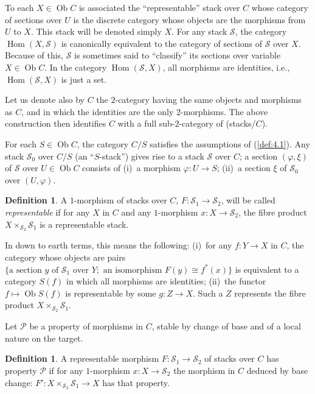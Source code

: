 \documentclass[10pt]{amsart}
\theoremstyle{plain}
\theoremstyle{definition}
\newtheorem{definition}[theorem]{Definition}
\DeclareMathOperator{\Hom}{Hom}
\DeclareMathOperator{\Ob}{Ob}
\begin{document}
To each $X \in \Ob C$ is associated the ``representable'' stack over $C$ whose category of sections over $U$ is the discrete category whose objects are the morphisms from $U$ to $X$. This stack will be denoted simply $X$. For any stack $\mathscr{S}$, the category $\Hom(X, \mathscr{S})$ is canonically equivalent to the category of sections of $\mathscr{S}$ over $X$. Because of this, $\mathscr{S}$ is sometimes said to ``classify'' its sections over variable $X \in \Ob C$. In the category $\Hom(\mathscr{S}, X)$, all morphisms are identities, i.e., $\Hom(\mathscr{S}, X)$ is just a set.

Let us denote also by $C$ the $2$-category having the same objects and morphisms as $C$, and in which the identities are the only $2$-morphisms. The above construction then identifies $C$ with a full sub-$2$-category of (stacks/$C$).

For each $S \in \Ob C$, the category $C/S$ satisfies the assumptions of (\ref{def:4.1}). Any stack $\mathscr{S}_0$ over $C/S$ (an ``$S$-stack'') gives rise to a stack $\mathscr{S}$ over $C$; a section $(\varphi, \xi)$ of $\mathscr{S}$ over $U \in \Ob C$ consists of (i)~a morphism $\varphi: U \to S$; (ii)~a section $\xi$ of $\mathscr{S}_0$ over $(U, \varphi)$.

\begin{definition}\label{def:4.2}
A $1$-morphism of stacks over $C$, $F: \mathscr{S}_1 \to \mathscr{S}_2$, will be called \emph{representable} if for any $X$ in $C$ and any $1$-morphism $x: X \to \mathscr{S}_2$, the fibre product $X \times_{\mathscr{S}_2} \mathscr{S}_1$ is a representable stack.
\end{definition}

In down to earth terms, this means the following: (i)~for any $f: Y \to X$ in $C$, the category whose objects are pairs $\{\text{a section } y \text{ of } \mathscr{S}_1 \text{ over } Y; \text{ an isomorphism } F(y) \cong f^*(x)\}$ is equivalent to a category $S(f)$ in which all morphisms are identities; (ii)~the functor $f \mapsto \Ob S(f)$ is representable by some $g: Z \to X$. Such a $Z$ represents the fibre product $X \times_{\mathscr{S}_2} \mathscr{S}_1$.

Let $\mathscr{P}$ be a property of morphisms in $C$, stable by change of base and of a local nature on the target.

\begin{definition}\label{def:4.3}
A representable morphism $F: \mathscr{S}_1 \to \mathscr{S}_2$ of stacks over $C$ has property $\mathscr{P}$ if for any $1$-morphism $x: X \to \mathscr{S}_2$ the morphism in $C$ deduced by base change: $F': X \times_{\mathscr{S}_2} \mathscr{S}_1 \to X$ has that property.
\end{definition}
\end{document}
